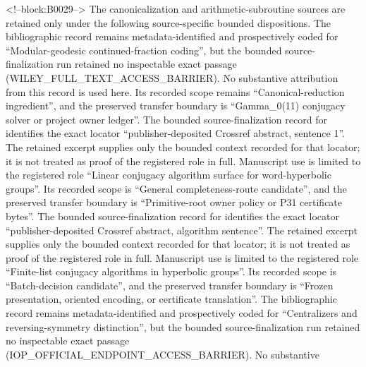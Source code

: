 \documentclass[11pt]{article}
\begin{document}
<!--block:B0029-->
The canonicalization and arithmetic-subroutine sources are retained only under the following source-specific bounded dispositions.
The bibliographic record \citep{P31-S15} remains metadata-identified and
prospectively coded for ``Modular-geodesic continued-fraction coding'', but the bounded source-finalization
run retained no inspectable exact passage (WILEY\_FULL\_TEXT\_ACCESS\_BARRIER).  No substantive
attribution from this record is used here.  Its recorded scope remains
``Canonical-reduction ingredient'', and the preserved transfer boundary is ``Gamma\_0(11) conjugacy solver or project owner ledger''.
The bounded source-finalization record for \citep{P31-S16} identifies
the exact locator ``publisher-deposited Crossref abstract, sentence 1''.  The retained excerpt supplies only the
bounded context recorded for that locator; it is not treated as proof of the
registered role in full.  Manuscript use is limited to the registered role ``Linear conjugacy algorithm surface for word-hyperbolic groups''.
Its recorded scope is ``General completeness-route candidate'', and the preserved
transfer boundary is ``Primitive-root owner policy or P31 certificate bytes''.
The bounded source-finalization record for \citep{P31-S17} identifies
the exact locator ``publisher-deposited Crossref abstract, algorithm sentence''.  The retained excerpt supplies only the
bounded context recorded for that locator; it is not treated as proof of the
registered role in full.  Manuscript use is limited to the registered role ``Finite-list conjugacy algorithms in hyperbolic groups''.
Its recorded scope is ``Batch-decision candidate'', and the preserved
transfer boundary is ``Frozen presentation, oriented encoding, or certificate translation''.
The bibliographic record \citep{P31-S18} remains metadata-identified and
prospectively coded for ``Centralizers and reversing-symmetry distinction'', but the bounded source-finalization
run retained no inspectable exact passage (IOP\_OFFICIAL\_ENDPOINT\_ACCESS\_BARRIER).  No substantive
\end{document}
